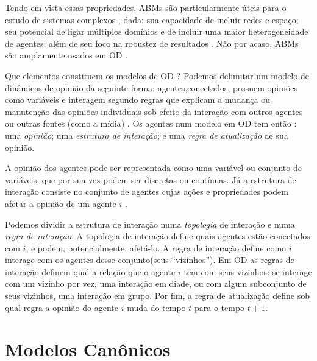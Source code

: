   Tendo em vista essas propriedades, ABMs são particularmente úteis para o
  estudo de sistemas complexos \cite{wilensky2015introduction}, dada: sua
  capacidade de incluir redes e espaço; seu potencial de ligar múltiplos
  domínios e de incluir uma maior heterogeneidade de agentes; além de seu foco
  na robustez de resultados \cite{de2014agent,wilensky2015introduction}. Não por
  acaso, ABMs são amplamente usados em OD  \cite{castellano2012social,flache2017}.

  Que elementos constituem os modelos de OD ? Podemos delimitar um modelo de
  dinâmicas de opinião da seguinte forma: agentes,conectados, possuem opiniões
  como variáveis e interagem segundo regras que explicam a mudança ou manutenção
  das opiniões individuais sob efeito da interação com outros agentes ou outras
  fontes (como a mídia) \cite{sirbu2017opinion}. Os agentes num modelo em OD tem
  então : uma \textit{opinião}; uma \textit{estrutura de interação}; e uma
  \textit{regra de atualização} de sua opinião.


  A opinião dos agentes pode ser representada como uma variável ou conjunto de
  variáveis, que por sua vez podem ser discretas ou contínuas. Já a estrutura de
  interação consiste no conjunto de agentes cujas ações e propriedades podem
  afetar a opinião de um agente \(i\) \cite{page2008uncertainty}.

  Podemos dividir a estrutura de interação numa \textit{topologia} de interação e
  numa \textit{regra de interação}. A topologia de interação define quais
  agentes estão conectados com \(i\), e podem, potencialmente, afetá-lo. A regra
  de interação define como \(i\) interage com os agentes desse conjunto(seus
  ``vizinhos''). Em OD as regras de interação definem qual a
  relação que o agente \(i\) tem com seus vizinhos: se interage com um vizinho
  por vez, uma interação em díade, ou com algum subconjunto de seus vizinhos,
  uma interação em grupo. Por fim, a regra de atualização define sob qual regra
  a opinião do agente \(i\) muda do tempo \(t\) para o tempo \(t+1\). 

  

  \section{Modelos Canônicos}

